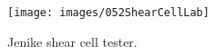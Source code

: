 \begin{figure}[!htb]
\centering
\texttt{[image: images/052ShearCellLab]}
\caption[JSCT]{Jenike shear cell tester.}
\label{fig:052ShearCellLab}
\end{figure}